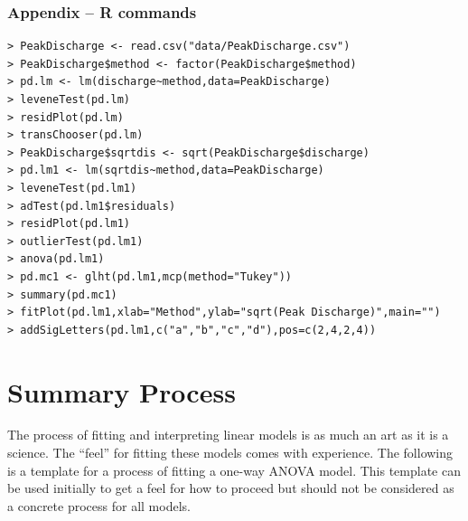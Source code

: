 \documentclass[10pt,openany]{book}\usepackage[]{graphicx}\usepackage[]{color}
\begin{document}
\subsubsection*{Appendix -- R commands}
\begin{Verbatim}[formatcom=\color{red},xleftmargin=5mm,commandchars=\\\{\}]
> PeakDischarge <- read.csv("data/PeakDischarge.csv")
> PeakDischarge$method <- factor(PeakDischarge$method)
> pd.lm <- lm(discharge~method,data=PeakDischarge)
> leveneTest(pd.lm)
> residPlot(pd.lm)
> transChooser(pd.lm)
> PeakDischarge$sqrtdis <- sqrt(PeakDischarge$discharge)
> pd.lm1 <- lm(sqrtdis~method,data=PeakDischarge)
> leveneTest(pd.lm1)
> adTest(pd.lm1$residuals)
> residPlot(pd.lm1)
> outlierTest(pd.lm1)
> anova(pd.lm1)
> pd.mc1 <- glht(pd.lm1,mcp(method="Tukey"))
> summary(pd.mc1)
> fitPlot(pd.lm1,xlab="Method",ylab="sqrt(Peak Discharge)",main="")
> addSigLetters(pd.lm1,c("a","b","c","d"),pos=c(2,4,2,4))
\end{Verbatim}



\section{Summary Process}
The process of fitting and interpreting linear models is as much an art as it is a science.  The ``feel'' for fitting these models comes with experience.  The following is a template for a process of fitting a one-way ANOVA model.  This template can be used initially to get a feel for how to proceed but should not be considered as a concrete process for all models.
\end{document}
